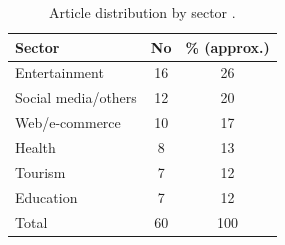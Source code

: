 \begin{table}
\centering
\begin{tabular}{lcc}
\toprule
\textbf{Sector} & \textbf{No} & \textbf{\% (approx.)} \\
\midrule
Entertainment & 16 & 26 \\
Social media/others & 12 & 20 \\
Web/e-commerce & 10 & 17 \\
Health & 8 & 13 \\
Tourism & 7 & 12 \\
Education & 7 & 12 \\
\midrule
Total & 60 & 100 \\
\bottomrule
\end{tabular}
\caption{Article distribution by sector \parencite{roy2022systematic}.}
\label{tab:sector_distribution}
\end{table}